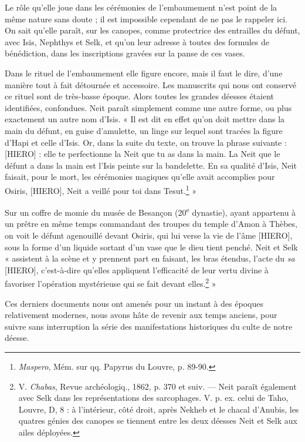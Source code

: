 \documentclass[a4paper, 11pt, oneside]{article}
\begin{document}
Le rôle qu'elle joue dans les cérémonies de l'embaumement n'est point de la même nature sans doute ; il est impossible cependant de ne pas le rappeler ici. On sait qu'elle paraît, sur les canopes, comme protectrice des entrailles du défunt, avec Isis, Nephthys et Selk, et qu'on leur adresse à toutes des formules de bénédiction, dans les inscriptions gravées sur la panse de ces vases.

Dans le rituel de l'embaumement elle figure encore, mais il faut le dire, d'une manière tout à fait détournée et accessoire. Les manuscrits qui nous ont conservé ce rituel sont de très-basse époque. Alors toutes les grandes déesses étaient identifiées, confondues. Neit paraît simplement comme une autre forme, ou plus exactement un autre nom d'Isis. « Il est dit en effet qu'on doit mettre dans la main du défunt, en guise d'amulette, un linge sur lequel sont tracées la figure d'Hapi et celle d'Isis. Or, dans la suite du texte, on trouve la phrase suivante : [HIERO] : elle te perfectionne la Neit que tu as dans la main. La Neit que le défunt a dans la main est l'Isis peinte sur la bandelette. En sa qualité d'Isis, Neit faisait, pour le mort, les cérémonies magiques qu'elle avait accomplies pour Osiris, [HIERO], Neit a veillé pour toi dans Tesut.\footnote{\emph{Maspero}, Mém. sur qq. Papyrus du Louvre, p. 89-90.} »

Sur un coffre de momie du musée de Besançon (20\textsuperscript{e} dynastie), ayant appartenu à un prêtre en même temps commandant des troupes du temple d'Amon à Thèbes, on voit le défunt agenouillé devant Osiris, qui lui verse la vie de l'âme [HIERO], sous la forme d'un liquide sortant d'un vase que le dieu tient penché. Neit et Selk « assistent à la scène et y prennent part en faisant, les bras étendus, l'acte du \emph{sa} [HIERO], c'est-à-dire qu'elles appliquent l'efficacité de leur vertu divine à favoriser l'opération mystérieuse qui se fait devant elles.\footnote{V. \emph{Chabas}, Revue archéologiq., 1862, p. 370 et suiv. --- Neit paraît également avec Selk dans les représentations des sarcophages. V. p. ex. celui de Taho, Louvre, D, 8 : à l'intérieur, côté droit, après Nekheb et le chacal d'Anubis, les quatres génies des canopes se tiennent entre les deux déesses Neit et Selk aux ailes déployées.} »

Ces derniers documents nous ont amenés pour un instant à des époques relativement modernes, nous avons hâte de revenir aux temps anciens, pour suivre sans interruption la série des manifestations historiques du culte de notre déesse.
\end{document}
